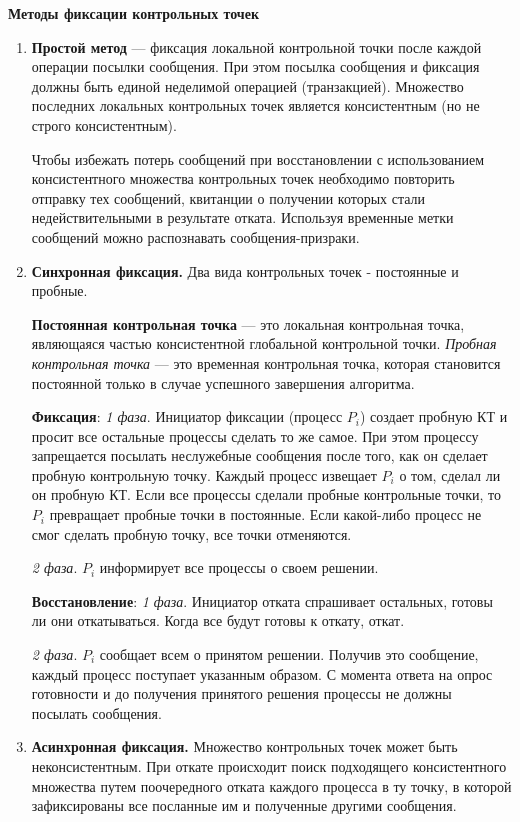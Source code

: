 \textbf{Методы фиксации контрольных точек}

\begin{enumerate}
    \item \textbf{Простой метод} --- фиксация локальной контрольной точки после каждой операции посылки сообщения. 
    При этом посылка сообщения и фиксация должны быть единой неделимой операцией (транзакцией). 
    Множество последних локальных контрольных точек является консистентным (но не строго консистентным).

    Чтобы избежать потерь сообщений при восстановлении с использованием консистентного множества контрольных точек необходимо повторить отправку тех сообщений, квитанции о получении которых стали недействительными в результате отката. 
    Используя временные метки сообщений можно распознавать сообщения-призраки.
    \item \textbf{Синхронная фиксация.} 
    Два вида контрольных точек - постоянные и пробные. 
    
    \textbf{Постоянная контрольная точка} --- это локальная контрольная точка, являющаяся частью консистентной глобальной контрольной точки. 
    \textit{Пробная контрольная точка} --- это временная контрольная точка, которая становится постоянной только в случае успешного завершения алгоритма.

    \textbf{Фиксация}: \textit{1 фаза}. 
    Инициатор фиксации (процесс $P_i$) создает пробную КТ и просит все остальные процессы сделать то же самое. 
    При этом процессу запрещается посылать неслужебные сообщения после того, как он сделает пробную контрольную точку. 
    Каждый процесс извещает $P_i$ о том, сделал ли он пробную КТ. 
    Если все процессы сделали пробные контрольные точки, то $P_i$ превращает пробные точки в постоянные. 
    Если какой-либо процесс не смог сделать пробную точку, все точки отменяются.

    \textit{2 фаза}. $P_i$ информирует все процессы о своем решении.
    
    \textbf{Восстановление}: \textit{1 фаза}. 
    Инициатор отката спрашивает остальных, готовы ли они откатываться. 
    Когда все будут готовы к откату, откат.

    \textit{2 фаза}. 
    $P_i$ сообщает всем о принятом решении. 
    Получив это сообщение, каждый процесс поступает указанным образом. 
    С момента ответа на опрос готовности и до получения принятого решения процессы не должны посылать сообщения.
    \item \textbf{Асинхронная фиксация.} 
    Множество контрольных точек может быть неконсистентным. 
    При откате происходит поиск подходящего консистентного множества путем поочередного отката каждого процесса в ту точку, в которой зафиксированы все посланные им и полученные другими сообщения.
\end{enumerate}


